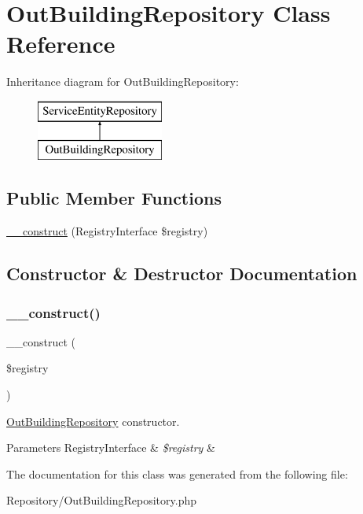 \hypertarget{class_app_1_1_repository_1_1_out_building_repository}{}\section{Out\+Building\+Repository Class Reference}
\label{class_app_1_1_repository_1_1_out_building_repository}
Inheritance diagram for Out\+Building\+Repository\+:\begin{figure}[H]
\begin{center}
\leavevmode
\includegraphics[height=2.000000cm]{class_app_1_1_repository_1_1_out_building_repository}
\end{center}
\end{figure}
\subsection*{Public Member Functions}
\begin{DoxyCompactItemize}
\item 
\mbox{\hyperlink{class_app_1_1_repository_1_1_out_building_repository_aadca7edd263e228921a1860bb6b9c252}{\+\_\+\+\_\+construct}} (Registry\+Interface \$registry)
\end{DoxyCompactItemize}


\subsection{Constructor \& Destructor Documentation}
\mbox{\label{class_app_1_1_repository_1_1_out_building_repository_aadca7edd263e228921a1860bb6b9c252}} 
\subsubsection{\texorpdfstring{\_\_construct()}{\_\_construct()}}
{\footnotesize\ttfamily \+\_\+\+\_\+construct (\begin{DoxyParamCaption}\item[{Registry\+Interface}]{\$registry }\end{DoxyParamCaption})}

\mbox{\hyperlink{class_app_1_1_repository_1_1_out_building_repository}{Out\+Building\+Repository}} constructor. 
\begin{DoxyParams}[1]{Parameters}
Registry\+Interface & {\em \$registry} & \\
\hline
\end{DoxyParams}


The documentation for this class was generated from the following file\+:\begin{DoxyCompactItemize}
\item 
Repository/Out\+Building\+Repository.\+php\end{DoxyCompactItemize}
